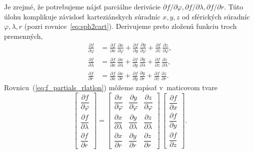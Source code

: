 \documentclass[a4paper, 12pt]{book}
\begin{document}
Je zrejmé, že potrebujeme nájsť parciálne derivácie $\partial f \slash \partial 
\varphi, \partial f \slash \partial \lambda, \partial f \slash \partial r$.  
Túto úlohu komplikuje závislosť karteziánskych súradníc $x, y, z$ od sférických 
súradníc $\varphi, \lambda, r$ (pozri rovnice~\ref{eq:sph2cart}).  Derivujeme 
preto zloženú funkciu troch premenných,
%
\begin{equation}
\label{eq:f_partials_rlatlon}
\begin{split}
\frac{\partial f}{\partial \varphi} &= \frac{\partial f}{\partial x} \, 
\frac{\partial x}{\partial \varphi} + \frac{\partial f}{\partial y} \, 
\frac{\partial y}{\partial \varphi} + \frac{\partial f}{\partial z} \, 
\frac{\partial z}{\partial \varphi}{,}\\
%
\frac{\partial f}{\partial \lambda} &= \frac{\partial f}{\partial x} \, 
\frac{\partial x}{\partial \lambda} + \frac{\partial f}{\partial y} \, 
\frac{\partial y}{\partial \lambda} + \frac{\partial f}{\partial z} \, 
\frac{\partial z}{\partial \lambda}{,}\\
%
\frac{\partial f}{\partial r} &= \frac{\partial f}{\partial x} \, 
\frac{\partial x}{\partial r} + \frac{\partial f}{\partial y} \, \frac{\partial 
y}{\partial r} + \frac{\partial f}{\partial z} \, \frac{\partial z}{\partial 
r}{.}
\end{split}
\end{equation}
%
Rovnicu~(\ref{eq:f_partials_rlatlon}) môžeme zapísať v~maticovom tvare
%
\begin{equation}
\label{eq:f_partials_rlatlon_2}
\begin{bmatrix}
\dfrac{\partial f}{\partial \varphi}\\[2ex]
\dfrac{\partial f}{\partial \lambda}\\[2ex]
\dfrac{\partial f}{\partial r}
\end{bmatrix}
%
=
%
\begin{bmatrix}
\dfrac{\partial x}{\partial \varphi} & \dfrac{\partial y}{\partial \varphi} 
& \dfrac{\partial z}{\partial \varphi}\\[2ex]
\dfrac{\partial x}{\partial \lambda} & \dfrac{\partial y}{\partial \lambda
} & \dfrac{\partial z}{\partial \lambda}\\[2ex]
\dfrac{\partial x}{\partial r} & \dfrac{\partial y}{\partial r} 
& \dfrac{\partial z}{\partial r}
\end{bmatrix}
%
\,
%
\begin{bmatrix}
\dfrac{\partial f}{\partial x}\\[2ex]
\dfrac{\partial f}{\partial y}\\[2ex]
\dfrac{\partial f}{\partial z}
\end{bmatrix}
%
{.}
\end{equation}
\end{document}
